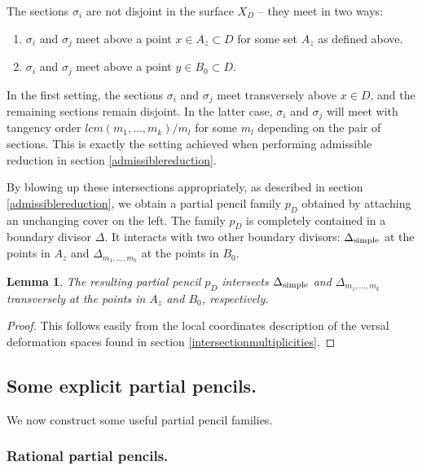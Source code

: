 \documentclass[reqno, 10 pt]{article}
\newtheorem{lem}[thm]{Lemma}
\theoremstyle{definition}
\theoremstyle{remark}
\numberwithin{equation}{section}
\numberwithin{thm}{section}
\numberwithin{prop}{section}
\numberwithin{lem}{section}
\numberwithin{cor}{section}
\numberwithin{conj}{section}
\numberwithin{defn}{section}
\begin{document}
    The sections $\sigma_{i}$ are not disjoint in the surface $X_{D}$ -- they meet in two ways:
    \begin{enumerate}\label{sigmameeting}
    \item $\sigma_{i}$ and $\sigma_{j}$ meet above a point $x \in A_{z} \subset D$ for some set $A_{z}$ as defined above. 
    \item $\sigma_{i}$ and $\sigma_{j}$ meet above a point $y \in B_{0} \subset D$.
    \end{enumerate}

    In the first setting, the sections $\sigma_{i}$ and $\sigma_{j}$ meet transversely above $x \in D$, and the remaining sections remain disjoint.  In the latter case, $\sigma_{i}$ and $\sigma_{j}$ will meet with tangency order $lcm(m_{1}, ... ,m_{k})/m_{l}$ for some $m_{l}$ depending on the pair of sections.  This is exactly the setting achieved when performing admissible reduction in section \ref{admissiblereduction}. 

    By blowing up these intersections appropriately, as described in section \ref{admissiblereduction}, we obtain a partial pencil family $p_{D}$ obtained by attaching an unchanging cover on the left. The family $p_{D}$ is completely contained in a boundary divisor $\Delta$.  It interacts with two other boundary divisors: $\Delta_{{\rm simple}}$ at the points in $A_{z}$ and $\Delta_{{m_{1}, ... ,m_{k}}}$ at the points in $B_{0}$.

    \begin{lem}\label{lemma:basechangefamilyproperties}
    The resulting partial pencil $p_{D}$ intersects $\Delta_{{\rm simple}}$ and $\Delta_{{m_{1}, ... ,m_{k}}}$ transversely at the points in $A_{z}$ and $B_{0}$, respectively.
    \end{lem}

    \begin{proof}
    This follows easily from the local coordinates description of the versal deformation spaces found in section \ref{intersectionmultiplicities}.
    \end{proof}

\subsection{Some explicit partial pencils.} \label{sec:somepartialpencils}
  We now construct some useful partial pencil families.

 \subsubsection{Rational partial pencils.}\label{ppencils} 
\end{document}
